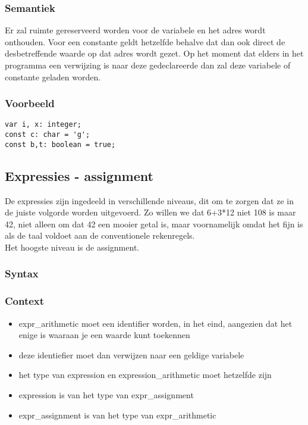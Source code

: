 \documentclass[]{article}
\begin{document}
\subsubsection{Semantiek}
Er zal ruimte gereserveerd worden voor de variabele en het adres wordt onthouden. Voor een constante geldt hetzelfde behalve dat dan ook direct de desbetreffende waarde op dat adres wordt gezet. Op het moment dat elders in het programma een verwijzing is naar deze gedeclareerde dan zal deze variabele of constante geladen worden.
\subsubsection{Voorbeeld}
\begin{lstlisting}[style=SELMA]
var i, x: integer;
const c: char = 'g';
const b,t: boolean = true;
\end{lstlisting}

\subsection{Expressies - assignment}
De expressies zijn ingedeeld in verschillende niveaus, dit om te zorgen dat ze in de juiste volgorde worden uitgevoerd. Zo willen we dat 6+3*12 niet 108 is maar 42, niet alleen om dat 42 een mooier getal is, maar voornamelijk omdat het fijn is als de taal voldoet aan de conventionele rekenregels. \\
Het hoogste niveau is de assignment.
\subsubsection{Syntax}

\subsubsection{Context}
\begin{itemize}
\item expr\_arithmetic moet een identifier worden, in het eind, aangezien dat het enige is waaraan je een waarde kunt toekennen
\item deze identiefier moet dan verwijzen naar een geldige variabele
\item het type van expression en expression\_arithmetic moet hetzelfde zijn
\item expression is van het type van expr\_assignment
\item expr\_assignment is van het type van expr\_arithmetic 
\end{itemize}
\end{document}
